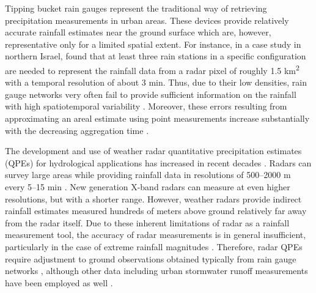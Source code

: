 \documentclass{ctuthesis}\usepackage[]{graphicx}\usepackage[]{color}
\begin{document}
Tipping bucket rain gauges represent the traditional way of retrieving precipitation measurements in urban areas. These devices provide relatively accurate rainfall estimates near the ground surface which are, however, representative only for a limited spatial extent. For instance, in a case study in northern Israel, \cite{pelegRadarSubpixelscaleRainfall2013} found that at least three rain stations in a specific configuration are needed to represent the rainfall data from a radar pixel of roughly 1.5 km\textsuperscript{2} with a temporal resolution of about 3 min. Thus, due to their low densities, rain gauge networks very often fail to provide sufficient information on the rainfall with high spatiotemporal variability \citep{villariniRainfallSamplingUncertainties2008}. Moreover, these errors resulting from approximating an areal estimate using point measurements increase substantially with the decreasing aggregation time \citep{woodAccuracyRainfallMeasurement2000}.


The development and use of weather radar quantitative precipitation estimates (QPEs) for hydrological applications has increased in recent decades \citep{berneRadarHydrologyUnfulfilled2013, thorndahlWeatherRadarRainfall2017}. Radars can survey large areas while providing rainfall data in resolutions of 500–2000 m every 5–15 min \citep{thorndahlWeatherRadarRainfall2017}. New generation X-band radars \citep[e.g.][]{chenQuantitativePrecipitationEstimation2015, schleissAccuracyWeatherRadar2020} can measure at even higher resolutions, but with a shorter range. However, weather radars provide indirect rainfall estimates measured hundreds of meters above ground relatively far away from the radar itself. Due to these inherent limitations of radar as a rainfall measurement tool, the accuracy of radar measurements is in general insufficient, particularly in the case of extreme rainfall magnitudes \citep{bardossyCombinationRadarDaily2017, thorndahlWeatherRadarRainfall2017}. Therefore, radar QPEs require adjustment to ground observations obtained typically from rain gauge networks \citep{harrisonHighresolutionPrecipitationEstimates2009}, although other data including urban stormwater runoff measurements have been employed as well \citep{ahmWeatherRadarAdjustment2017}.
\end{document}
